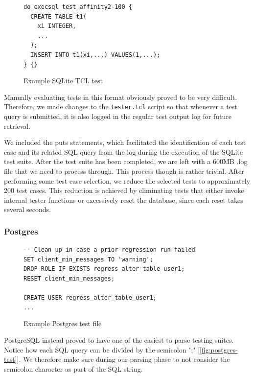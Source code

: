 \documentclass[acmsmall,nonacm]{acmart}
\begin{document}
\begin{figure}[h!]
\begin{verbatim}
do_execsql_test affinity2-100 {
  CREATE TABLE t1(
    xi INTEGER,
    ...
  );
  INSERT INTO t1(xi,...) VALUES(1,...);
} {}
\end{verbatim}
\vspace{-0.3cm}
\caption{Example SQLite TCL test}
\label{fig:sqlite-test}
\vspace{-0.3cm}
\end{figure}

Manually evaluating tests in this format obviously proved to be very difficult. Therefore, we made changes to the \texttt{tester.tcl} script so that whenever a test query is submitted, it is also logged in the regular test output log for future retrieval.

We included the puts statements, which facilitated the identification of each test case and its related SQL query from the log during the execution of the SQLite test suite. After the test suite has been completed, we are left with a 600MB .log file that we need to process through. This process though is rather trivial. After performing some test case selection, we reduce the selected tests to approximately 200 test cases. This reduction is achieved by eliminating tests that either invoke internal tester functions or excessively reset the database, since each reset takes several seconds.

\subsubsection*{Postgres}
\begin{figure}[h!]
\begin{verbatim}
-- Clean up in case a prior regression run failed
SET client_min_messages TO 'warning';
DROP ROLE IF EXISTS regress_alter_table_user1;
RESET client_min_messages;

CREATE USER regress_alter_table_user1;
...
\end{verbatim}
\vspace{-0.3cm}
\caption{Example Postgres test file}
\label{fig:postgres-test}
\vspace{-0.3cm}
\end{figure}
PostgreSQL instead proved to have one of the easiest to parse testing suites. Notice how each SQL query can be divided by the semicolon ";" [\autoref{fig:postgres-test}]. We therefore make sure during our parsing phase to not consider the semicolon character as part of the SQL string.
\end{document}
